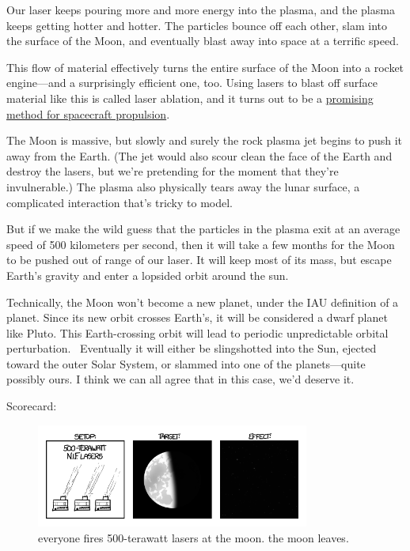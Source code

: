 {Our laser keeps pouring more and more energy into the plasma, and the plasma keeps getting hotter and hotter. The particles bounce off each other, slam into the surface of the Moon, and eventually blast away into space at a terrific speed.}

{This flow of material effectively turns the entire surface of the Moon into a rocket engine—and a surprisingly efficient one, too. Using lasers to blast off surface material like this is called laser ablation, and it turns out to be a \href{http://materials.web.psi.ch/Publications/Publ\_MatDev\_files/2010/Claude\_JPP\_2010.pdf}{promising method for spacecraft propulsion}.}

{The Moon is massive, but slowly and surely the rock plasma jet begins to push it away from the Earth. (The jet would also scour clean the face of the Earth and destroy the lasers, but we’re pretending for the moment that they’re invulnerable.) The plasma also physically tears away the lunar surface, a complicated interaction that’s tricky to model.}

{But if we make the wild guess that the particles in the plasma exit at an average speed of 500 kilometers per second, then it will take a few months for the Moon to be pushed out of range of our laser. It will keep most of its mass, but escape Earth’s gravity and enter a lopsided orbit around the sun.}

{Technically, the Moon won’t become a new planet, under the IAU definition of a planet. Since its new orbit crosses Earth’s, it will be considered a dwarf planet like Pluto. This Earth-crossing orbit will lead to periodic unpredictable orbital perturbation.  Eventually it will either be slingshotted into the Sun, ejected toward the outer Solar System, or slammed into one of the planets—quite possibly ours. I think we can all agree that in this case, we’d deserve it.}

{Scorecard:}

\begin{figure}[!htbp]
\centering
\includegraphics[scale=0.5, max width=0.8\textwidth]{imgs/a/13/laser_pointer_terawatt.png}
\caption{everyone fires 500-terawatt lasers at the moon. the moon leaves.}
\end{figure}

